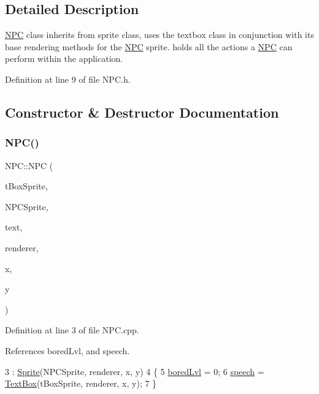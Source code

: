 \subsection{Detailed Description}
\hyperlink{class_n_p_c}{N\+PC} class inherits from sprite class, uses the textbox class in conjunction with it\textquotesingle{}s base rendering methods for the \hyperlink{class_n_p_c}{N\+PC} sprite. holds all the actions a \hyperlink{class_n_p_c}{N\+PC} can perform within the application. 

Definition at line 9 of file N\+P\+C.\+h.



\subsection{Constructor \& Destructor Documentation}
\mbox{\label{class_n_p_c_a9db0a86ef6a5ab2b406c46c8ec6d740a}} 
\subsubsection{\texorpdfstring{N\+P\+C()}{NPC()}}
{\footnotesize\ttfamily N\+P\+C\+::\+N\+PC (\begin{DoxyParamCaption}\item[{std\+::string}]{t\+Box\+Sprite,  }\item[{std\+::string}]{N\+P\+C\+Sprite,  }\item[{std\+::string}]{text,  }\item[{S\+D\+L\+\_\+\+Renderer $\ast$}]{renderer,  }\item[{int}]{x,  }\item[{int}]{y }\end{DoxyParamCaption})}



Definition at line 3 of file N\+P\+C.\+cpp.



References bored\+Lvl, and speech.


\begin{DoxyCode}
3                                                                                                         : 
      \hyperlink{class_sprite_a12cba3ac1868418add3c4d95ce87e615}{Sprite}(NPCSprite, renderer, x, y)
4 \{
5     \hyperlink{class_n_p_c_a1f67b7dfca770653fc523dfc558e7fdf}{boredLvl} = 0;
6     \hyperlink{class_n_p_c_a1a1be15df827227f45559388897a9cd5}{speech} = \hyperlink{class_text_box}{TextBox}(tBoxSprite, renderer, x, y);
7 \}
\end{DoxyCode}


